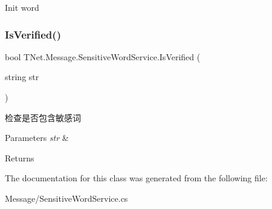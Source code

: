 Init word 

\mbox{\label{class_t_net_1_1_message_1_1_sensitive_word_service_af93647ecbf4497a34386b84a4d5066e7}} 
\subsubsection{\texorpdfstring{Is\+Verified()}{IsVerified()}}
{\footnotesize\ttfamily bool T\+Net.\+Message.\+Sensitive\+Word\+Service.\+Is\+Verified (\begin{DoxyParamCaption}\item[{string}]{str }\end{DoxyParamCaption})}



检查是否包含敏感词 


\begin{DoxyParams}{Parameters}
{\em str} & \\
\hline
\end{DoxyParams}
\begin{DoxyReturn}{Returns}

\end{DoxyReturn}


The documentation for this class was generated from the following file\+:\begin{DoxyCompactItemize}
\item 
Message/Sensitive\+Word\+Service.\+cs\end{DoxyCompactItemize}
